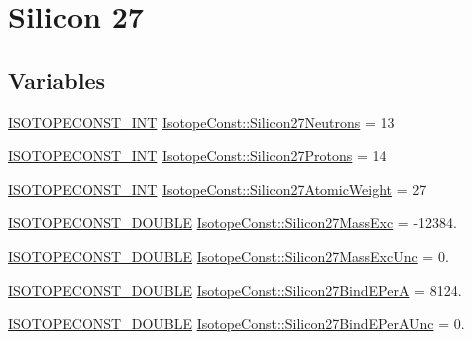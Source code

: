 \hypertarget{group___isotope_const-_silicon-_si27}{}\section{Silicon 27}
\label{group___isotope_const-_silicon-_si27}
\subsection*{Variables}
\begin{DoxyCompactItemize}
\item 
\mbox{\hyperlink{group___isotope_const-_macros_ga5f18360b3e99483a35c32d789e62621c}{I\+S\+O\+T\+O\+P\+E\+C\+O\+N\+S\+T\+\_\+\+I\+NT}} \mbox{\hyperlink{group___isotope_const-_silicon-_si27_gab6902dc45004185e0bdafb02f0eff163}{Isotope\+Const\+::\+Silicon27\+Neutrons}} = 13
\item 
\mbox{\hyperlink{group___isotope_const-_macros_ga5f18360b3e99483a35c32d789e62621c}{I\+S\+O\+T\+O\+P\+E\+C\+O\+N\+S\+T\+\_\+\+I\+NT}} \mbox{\hyperlink{group___isotope_const-_silicon-_si27_ga3da3e772a81e07780e697997ce32375e}{Isotope\+Const\+::\+Silicon27\+Protons}} = 14
\item 
\mbox{\hyperlink{group___isotope_const-_macros_ga5f18360b3e99483a35c32d789e62621c}{I\+S\+O\+T\+O\+P\+E\+C\+O\+N\+S\+T\+\_\+\+I\+NT}} \mbox{\hyperlink{group___isotope_const-_silicon-_si27_ga209fae511405f001dcd3121ee442106f}{Isotope\+Const\+::\+Silicon27\+Atomic\+Weight}} = 27
\item 
\mbox{\hyperlink{group___isotope_const-_macros_ga8f45a7272ce02c0b4c65c44636ed719a}{I\+S\+O\+T\+O\+P\+E\+C\+O\+N\+S\+T\+\_\+\+D\+O\+U\+B\+LE}} \mbox{\hyperlink{group___isotope_const-_silicon-_si27_gaefa57c87a43156220a266b814330b788}{Isotope\+Const\+::\+Silicon27\+Mass\+Exc}} = -\/12384.
\item 
\mbox{\hyperlink{group___isotope_const-_macros_ga8f45a7272ce02c0b4c65c44636ed719a}{I\+S\+O\+T\+O\+P\+E\+C\+O\+N\+S\+T\+\_\+\+D\+O\+U\+B\+LE}} \mbox{\hyperlink{group___isotope_const-_silicon-_si27_ga93f59109b779ed7b2272649916badaf5}{Isotope\+Const\+::\+Silicon27\+Mass\+Exc\+Unc}} = 0.
\item 
\mbox{\hyperlink{group___isotope_const-_macros_ga8f45a7272ce02c0b4c65c44636ed719a}{I\+S\+O\+T\+O\+P\+E\+C\+O\+N\+S\+T\+\_\+\+D\+O\+U\+B\+LE}} \mbox{\hyperlink{group___isotope_const-_silicon-_si27_ga2293fe8eb95c1435714a0099a5347c0a}{Isotope\+Const\+::\+Silicon27\+Bind\+E\+PerA}} = 8124.
\item 
\mbox{\hyperlink{group___isotope_const-_macros_ga8f45a7272ce02c0b4c65c44636ed719a}{I\+S\+O\+T\+O\+P\+E\+C\+O\+N\+S\+T\+\_\+\+D\+O\+U\+B\+LE}} \mbox{\hyperlink{group___isotope_const-_silicon-_si27_gacd9180126bceafca0b45a9ec9d5fd776}{Isotope\+Const\+::\+Silicon27\+Bind\+E\+Per\+A\+Unc}} = 0.

\end{DoxyCompactItemize}
